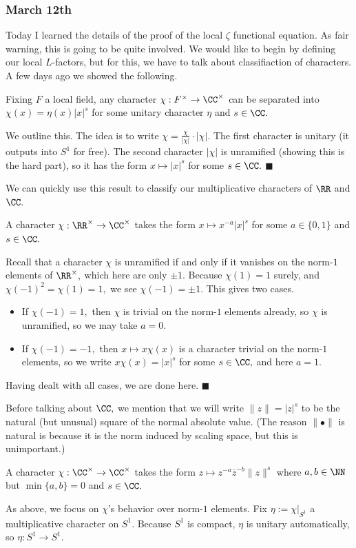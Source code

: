 \subsubsection{March 12th}
Today I learned the details of the proof of the local $\zeta$ functional equation. As fair warning, this is going to be quite involved. We would like to begin by defining our local $L$-factors, but for this, we have to talk about classifiaction of characters. A few days ago we showed the following.
\begin{proposition}
    Fixing $F$ a local field, any character $\chi:F^\times\to\CC^\times$ can be separated into $\chi(x)=\eta(x)|x|^s$ for some unitary character $\eta$ and $s\in\CC.$
\end{proposition}
We outline this. The idea is to write $\chi=\frac{\chi}{|\chi|}\cdot|\chi|.$ The first character is unitary (it outputs into $S^1$ for free). The second character $|\chi|$ is unramified (showing this is the hard part), so it has the form $x\mapsto|x|^s$ for some $s\in\CC.$ $\blacksquare$

We can quickly use this result to classify our multiplicative characters of $\RR$ and $\CC.$
\begin{lemma}
    A character $\chi:\RR^\times\to\CC^\times$ takes the form $x\mapsto x^{-a}|x|^s$ for some $a\in\{0,1\}$ and $s\in\CC.$
\end{lemma}
Recall that a character $\chi$ is unramified if and only if it vanishes on the norm-$1$ elements of $\RR^\times,$ which here are only $\pm1.$ Because $\chi(1)=1$ surely, and $\chi(-1)^2=\chi(1)=1,$ we see $\chi(-1)=\pm1.$ This gives two cases.
\begin{itemize}
    \item If $\chi(-1)=1,$ then $\chi$ is trivial on the norm-$1$ elements already, so $\chi$ is unramified, so we may take $a=0.$
    \item If $\chi(-1)=-1,$ then $x\mapsto x\chi(x)$ is a character trivial on the norm-$1$ elements, so we write $x\chi(x)=|x|^s$ for some $s\in\CC,$ and here $a=1.$ 
\end{itemize}
Having dealt with all cases, we are done here. $\blacksquare$

Before talking about $\CC,$ we mention that we will write $\lVert z\rVert=|z|^s$ to be the natural (but unusual) square of the normal absolute value. (The reason $\lVert\bullet\rVert$ is natural is because it is the norm induced by scaling space, but this is unimportant.)
\begin{lemma}
    A character $\chi:\CC^\times\to\CC^\times$ takes the form $z\mapsto z^{-a}\overline z^{-b}\lVert z\rVert^s$ where $a,b\in\NN$ but $\min\{a,b\}=0$ and $s\in\CC.$
\end{lemma}
As above, we focus on $\chi$'s behavior over norm-$1$ elements. Fix $\eta:=\chi|_{S^1}$ a multiplicative character on $S^1.$ Because $S^1$ is compact, $\eta$ is unitary automatically, so $\eta:S^1\to S^1.$

